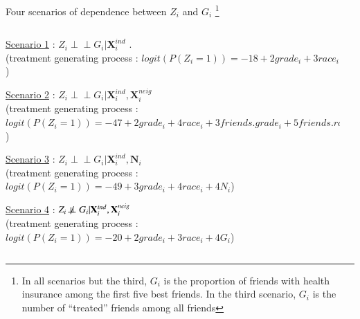 \documentclass[notes,11pt, aspectratio=169]{beamer}
\begin{document}
\begin{frame}{Four scenarios of dependence between $Z_i$ and $G_i$ \footnote{In all scenarios but the third, $G_i$ is the proportion of friends with health insurance among the first five best friends. In the third scenario, $G_i$ is the number of “treated” friends among all friends}}
\begin{columns}[T] %
\begin{column}{1\textwidth}
\begin{wideitemize}
    \item \underline{Scenario 1} : $Z_i \perp\!\!\!\perp G_i | \mathbf{X}_{i}^{ind} $ .\\ (treatment generating process : $logit(P(Z_i=1))=-18+2grade_i+3race_i$)
    \item \underline{Scenario 2} : $Z_i  \perp\!\!\!\perp G_i | \mathbf{X}_{i}^{ind} , \mathbf{X}_{i}^{neig} $ \\
    (treatment generating process : $logit(P(Z_i=1))=-47+2grade_i+4race_i+3friends.grade_i+5friends.race_i$)
    \item \underline{Scenario 3} : $Z_i  \perp\!\!\!\perp G_i | \mathbf{X}_{i}^{ind} , \mathbf{N}_{i} $ \\
    (treatment generating process : $logit(P(Z_i=1))=-49+3grade_i+4race_i+4N_i$)
    \item \underline{Scenario 4} : $Z_i \not \! \perp\!\!\!\perp G_i | \mathbf{X}_{i}^{ind} ,  \mathbf{X}_{i}^{neig} $\\
    (treatment generating process : $logit(P(Z_i=1))=-20+2grade_i+3race_i+4G_i$)
\end{wideitemize}
\end{column}%
\hfill%
\begin{column}{.38\textwidth}
  \vspace{20pt}
  \vspace{20pt}
\end{column}%
\end{columns}
\end{frame}
\end{document}
